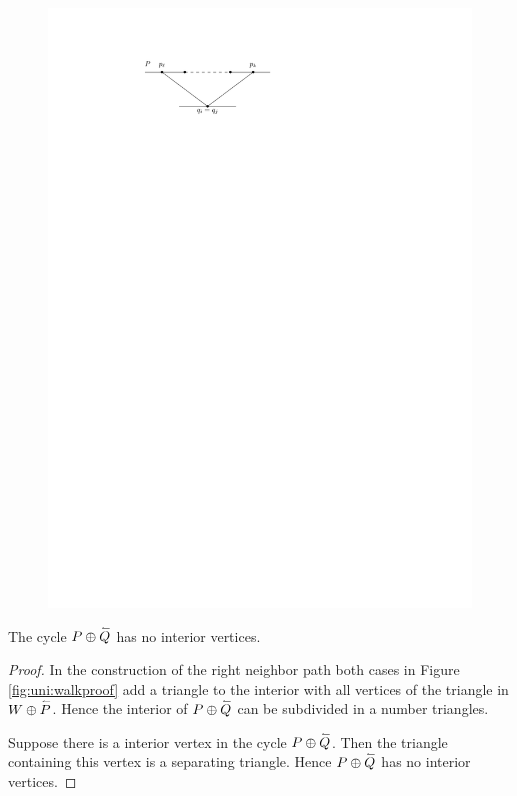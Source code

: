     \begin{figure}[h]
      \centering
      \includegraphics[scale=1]{unifiedAlgo/img/rightNeighbourwalk/neighborPathisPath.pdf}
      \caption{}
      \label{fig:right:path}
    \end{figure}

    \begin{lemma}
      \label{lm:right:neighbourwalkNoInteriorVertex}
      The cycle $P \oplus \accentset{\leftharpoonup}{Q}$ has no interior vertices.
    \end{lemma}
    \begin{proof}
      In the construction of the right neighbor path both cases in Figure \ref{fig:uni:walkproof} add a triangle to the interior with all vertices of the triangle in $W \oplus \accentset{\leftharpoonup}{P}$. Hence the interior of $P \oplus \accentset{\leftharpoonup}{Q}$ can be subdivided in a number triangles.

      Suppose there is a interior vertex in the cycle $P \oplus \accentset{\leftharpoonup}{Q}$. Then the triangle containing this vertex is a separating triangle. Hence $P \oplus \accentset{\leftharpoonup}{Q}$ has no interior vertices.
    \end{proof}


